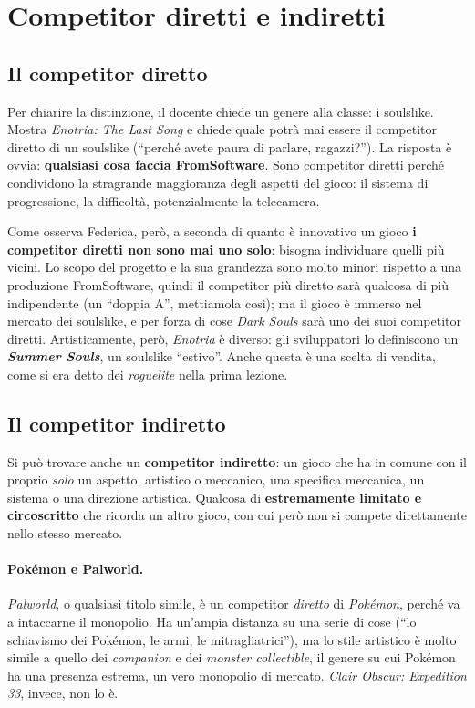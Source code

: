 \section{Competitor diretti e indiretti}
\label{sec:competitor-diretti}

\subsection{Il competitor diretto}

Per chiarire la distinzione, il docente chiede un genere alla classe: i
soulslike. Mostra \emph{Enotria: The Last Song} e chiede quale potrà mai
essere il competitor diretto di un soulslike (``perché avete paura di
parlare, ragazzi?''). La risposta è ovvia: \textbf{qualsiasi cosa faccia
FromSoftware}. Sono competitor diretti perché condividono la stragrande
maggioranza degli aspetti del gioco: il sistema di progressione, la
difficoltà, potenzialmente la telecamera.

Come osserva Federica, però, a seconda di quanto è innovativo un gioco
\textbf{i competitor diretti non sono mai uno solo}: bisogna individuare quelli
più vicini. Lo scopo del progetto e la sua grandezza sono molto minori
rispetto a una produzione FromSoftware, quindi il competitor più diretto sarà
qualcosa di più indipendente (un ``doppia A'', mettiamola così); ma il gioco è
immerso nel mercato dei soulslike, e per forza di cose \emph{Dark Souls} sarà
uno dei suoi competitor diretti. Artisticamente, però, \emph{Enotria} è
diverso: gli sviluppatori lo definiscono un \textbf{\emph{Summer Souls}}, un
soulslike ``estivo''. Anche questa è una scelta di vendita, come si era detto
dei \emph{roguelite} nella prima lezione.

\subsection{Il competitor indiretto}

Si può trovare anche un \textbf{competitor indiretto}: un gioco che ha in
comune con il proprio \emph{solo} un aspetto, artistico o meccanico, una
specifica meccanica, un sistema o una direzione artistica. Qualcosa di
\textbf{estremamente limitato e circoscritto} che ricorda un altro gioco, con
cui però non si compete direttamente nello stesso mercato.

\paragraph{Pokémon e Palworld.} \emph{Palworld}, o qualsiasi titolo simile,
è un competitor \emph{diretto} di \emph{Pokémon}, perché va a intaccarne il
monopolio. Ha un'ampia distanza su una serie di cose (``lo schiavismo dei
Pokémon, le armi, le mitragliatrici''), ma lo stile artistico è molto simile
a quello dei \emph{companion} e dei \emph{monster collectible}, il genere su
cui Pokémon ha una presenza estrema, un vero monopolio di mercato.
\emph{Clair Obscur: Expedition 33}, invece, non lo è.

